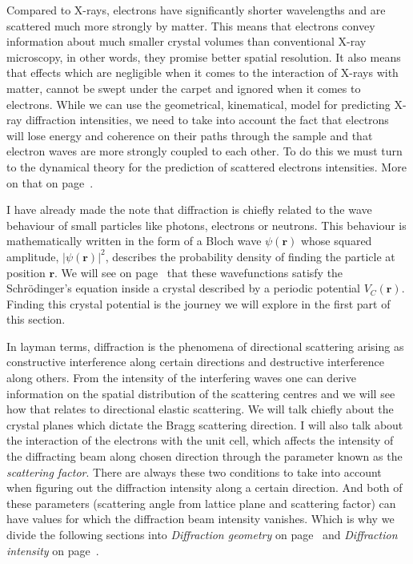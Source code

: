 Compared to X-rays, electrons have significantly shorter wavelengths and are scattered much more strongly by matter. This means that electrons convey information about much smaller crystal volumes than conventional X-ray microscopy, in other words, they promise better spatial resolution. It also means that effects which are negligible when it comes to the  interaction of X-rays with matter, cannot be swept under the carpet and ignored when it comes to electrons. While we can  use the geometrical, \ie kinematical, model for predicting X-ray diffraction intensities,  we need to take into account the fact that electrons   will lose energy and coherence on their paths through the sample and that electron waves are more strongly coupled to each other. To do this we must turn to the dynamical theory for the prediction of scattered electrons intensities. More on that on page~\pageref{sec:kinvsDyn}.

I have already made the note that diffraction is chiefly related to the wave behaviour of small particles like photons, electrons or neutrons. This behaviour is mathematically written in the form of a Bloch wave $\psi(\mathbf{r})$ whose squared amplitude, $|\psi(\mathbf{r})|^2$, describes the probability density of finding the particle at position $\mathbf{r}$. We will see on page~\pageref{sec:DHW} that these wavefunctions satisfy the Schr{\"o}dinger's equation inside a crystal described by a periodic potential $V_C(\mathbf{r})$. Finding this crystal potential is the journey we will explore in the first part of this section.

In layman terms, diffraction is the phenomena of directional scattering arising as constructive interference along certain directions and destructive interference along others. From the intensity of the interfering waves one can derive information on the spatial distribution of the scattering centres and we will see how that relates to directional elastic scattering. We will talk chiefly about the crystal planes which dictate the Bragg scattering direction.
I will also talk about the interaction of the electrons with the unit cell, which affects the intensity of the diffracting beam along chosen direction through the parameter known as the \textit{scattering factor}. There are always these two conditions to take into account when figuring out the diffraction intensity along a certain direction. And both of these parameters (scattering angle from lattice plane and scattering factor) can have values for which the diffraction beam intensity vanishes. Which is why we divide the following sections into \textit{Diffraction geometry} on page~\pageref{sec:geometry} and  \textit{Diffraction intensity} on page~\pageref{sec:intensity}.





